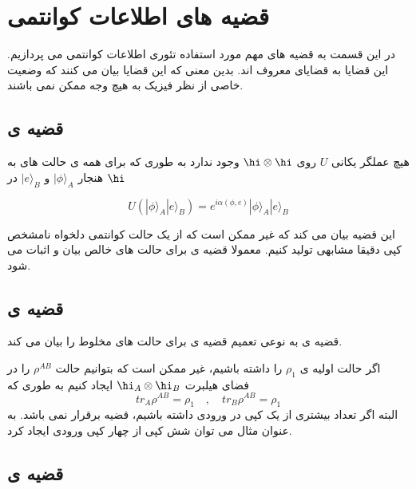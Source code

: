 \section{قضیه های اطلاعات کوانتمی}
در این قسمت به قضیه های مهم مورد استفاده تئوری اطلاعات کوانتمی می پردازیم. این قضایا به قضایای 
معروف اند. بدین معنی که این قضایا بیان می کنند که وضعیت خاصی از نظر فیزیک به هیچ وجه ممکن نمی باشند. 
\subsection{قضیه ی }

هیچ عملگر یکانی
$U$
روی
$\hi \otimes \hi$
وجود ندارد به طوری که برای همه ی حالت های به هنجار 
$| \phi \rangle_A$
و
$| e \rangle_B$
در
$\hi$

\begin{equation}
	U(| \phi \rangle_A | e \rangle_B) = e^{i\alpha (\phi,e)} | \phi \rangle_A | e \rangle_B
\end{equation}

این قضیه بیان می کند که غیر ممکن است که از یک حالت کوانتمی دلخواه نامشخص کپی دقیقا مشابهی تولید کنیم. معمولا قضیه ی 
برای حالت های خالص بیان و اثبات می شود.




\subsection{قضیه ی }
 قضیه ی 
 به نوعی تعمیم قضیه ی
  برای حالت های مخلوط را بیان می کند.
  
  اگر حالت اولیه ی
  $\rho_1$
  را داشته باشیم، غیر ممکن است که بتوانیم حالت
  $\rho^{AB}$
  را در فضای هیلبرت
  $\hi_A \otimes \hi_B$
  ایجاد کنیم به طوری که 
  \begin{equation}
  	tr_A \rho^{AB} = \rho_1 \quad,\quad tr_B \rho^{AB}=\rho_1
  \end{equation}
  البته اگر تعداد بیشتری از یک کپی در ورودی داشته باشیم، قضیه برقرار نمی باشد. به عنوان مثال می توان شش کپی از چهار کپی ورودی ایجاد کرد.
\subsection{قضیه ی }

